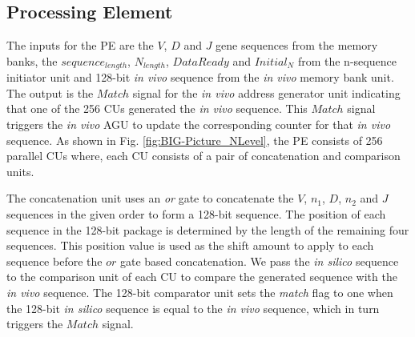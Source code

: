 %
%
\subsection{Processing Element }\label{subsec:PE}
The inputs for the PE are the $V$, $D$ and $J$ gene sequences from the memory banks, the $sequence_{length}$, $N_{length}$, $Data Ready$ and $Initial_N$  from the n-sequence initiator unit and 128-bit \emph{in vivo} sequence from the \emph{in vivo} memory bank unit. The output is the $Match$ signal for the \emph{in vivo} address generator unit indicating that one of the 256 CUs generated the  \emph{in vivo} sequence. This $Match$ signal triggers the \emph{in vivo} AGU to update the corresponding counter for that  \emph{in vivo} sequence. As shown in Fig. \ref{fig:BIG-Picture_NLevel}, the PE consists of 256 parallel CUs where, each CU consists of a pair of concatenation and comparison units.


The concatenation unit uses an \emph{or} gate to concatenate the $V$, $n_1$, $D$, $n_2$ and $J$ sequences in the given order to form a 128-bit sequence. The position of each sequence in the 128-bit package is determined by the length of the remaining four sequences. This position value is used as the shift amount to apply to each sequence before the $or$ gate based concatenation. We pass the \emph{in silico} sequence to the comparison unit of each CU to compare the generated sequence with the \emph{in vivo} sequence. The 128-bit comparator unit sets the \emph{match} flag to one when the 128-bit \emph{in silico} sequence is equal to the \emph{in vivo} sequence, which in turn triggers the $Match$ signal. 


